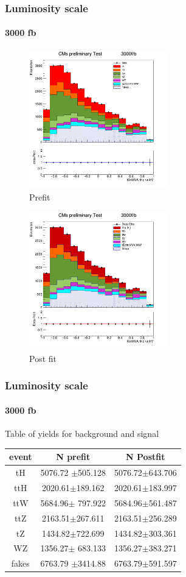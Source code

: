 \documentclass[11pt]{beamer}
\begin{document}
\begin{frame}
\frametitle{Luminosity scale}
\framesubtitle{3000 fb}
\begin{multicols}{2}
	\begin{center}
		\begin{figure}
			\includegraphics[width=6cm,height=6cm]{figures/3000fb/kin-3000.png}
				\caption*{Prefit }
		\end{figure}
	\end{center}
	\columnbreak
	\begin{center}
		\begin{figure}
			\includegraphics[width=6cm,height=6cm]{figures/3000fb/simple.png}
				\caption*{Post fit }
		\end{figure}
	\end{center}
\end{multicols}
\end{frame}

\begin{frame}
\frametitle{Luminosity scale}
\framesubtitle{3000 fb}
Table of yields for background and signal
\begin{table}
	\begin{tabular}{|c|c|c|}
		\hline
event  & N prefit    & N Postfit \\
\hline
tH & 5076.72 $\pm$505.128 & 5076.72$\pm$643.706\\
\hline
ttH  & 2020.61$\pm$189.162 & 2020.61$\pm$183.997\\
\hline
ttW  & 5684.96$\pm$  797.922& 5684.96$\pm$561.487\\
\hline
ttZ  & 2163.51$\pm$267.611 & 2163.51$\pm$256.289\\
\hline
tZ & 1434.82$\pm$722.699 & 1434.82$\pm$303.361\\
\hline
WZ & 1356.27$\pm$ 683.133& 1356.27$\pm$383.271\\
\hline
fakes  & 6763.79 $\pm$3414.88 & 6763.79$\pm$591.597\\
	\hline
	\end{tabular}
\end{table}
\end{frame}
\end{document}
